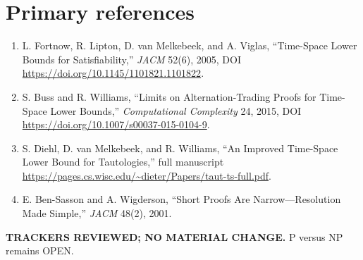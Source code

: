 \documentclass[11pt]{article}
\begin{document}
\section*{Primary references}
\begin{enumerate}
  \item L. Fortnow, R. Lipton, D. van Melkebeek, and A. Viglas, ``Time-Space Lower Bounds for Satisfiability,'' \emph{JACM} 52(6), 2005, DOI \url{https://doi.org/10.1145/1101821.1101822}.
  \item S. Buss and R. Williams, ``Limits on Alternation-Trading Proofs for Time-Space Lower Bounds,'' \emph{Computational Complexity} 24, 2015, DOI \url{https://doi.org/10.1007/s00037-015-0104-9}.
  \item S. Diehl, D. van Melkebeek, and R. Williams, ``An Improved Time-Space Lower Bound for Tautologies,'' full manuscript \url{https://pages.cs.wisc.edu/~dieter/Papers/taut-ts-full.pdf}.
  \item E. Ben-Sasson and A. Wigderson, ``Short Proofs Are Narrow---Resolution Made Simple,'' \emph{JACM} 48(2), 2001.
\end{enumerate}

\textbf{TRACKERS REVIEWED; NO MATERIAL CHANGE.}  P versus NP remains OPEN.

\end{document}
